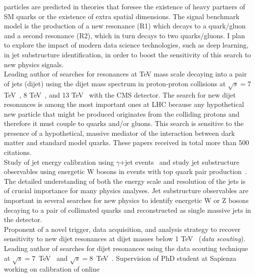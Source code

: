 \documentclass[10pt, a4paper]{article}
\newcommand{\years}[1]{\marginnote{\hskip-0.2in{\scriptsize #1}}}
\begin{document}
particles are predicted in theories that foresee the existence of
heavy partners of SM quarks or the existence of extra spatial
dimensions. The signal benchmark model is the production of a new resonance (R1)
which decays to a quark/gluon and a second resonance (R2), which in
turn decays to two quarks/gluons. I plan to explore the impact of
modern data science technologies, such as deep learning, in jet substructure identification, in order to boost the sensitivity of this search to new physics signals.\\ [1em] 
\years{09/2011 - 09/2018}Leading author of searches for resonances at
TeV mass scale decaying into a pair of jets (dijet) using the dijet mass spectrum 
in proton-proton collisions at $\sqrt{s}=$7 TeV~\cite{CMS:2012yf,AN-12-012}, 8
TeV~\cite{Chatrchyan:2013qha,AN-12-229,Khachatryan:2015sja,AN-12-455},
and 13 TeV~\cite{Sirunyan:2016iap,AN-16-202,Khachatryan:2015dcf,AN-15-063,AN-15-175} with the CMS
detector. The search for new dijet resonances is among the most important ones at LHC because any hypothetical new
particle that might be produced originates from the colliding protons
and therefore it must couple to quarks and/or gluons. This search is
sensitive to the presence of a hypothetical, massive  mediator of the interaction between dark matter and
standard model quarks. These papers received in total more than 500 citations.\\ [1em] 
\years{01/2015 - 09/2018}Study of jet energy calibration using $\gamma$+jet events~\cite{AN-16-344} and
study jet substructure observables using energetic W bosons in events with
top quark pair production~\cite{AN-17-051}. The detailed understanding of both 
the energy scale and resolution of the jets is of crucial importance
for many physics analyses. Jet substructure observables are important 
in several searches for new physics to identify energetic W or Z bosons decaying to 
a pair of collimated quarks and reconstructed as single massive jets
in the detector. \\ [1em] 
\years{09/2011 - 09/2018}
Proponent of a novel trigger, data acquisition, and analysis
strategy to recover sensitivity to new dijet resonances at dijet
masses below 1 TeV~\cite{CMS-DP-2012-022} ({\it data scouting}).
Leading author of searches for dijet resonances using the data
scouting technique at $\sqrt{s}=7$~TeV~\cite{CMS-PAS-EXO-11-094} 
and $\sqrt{s}=8$~TeV~\cite{Khachatryan:2016ecr,AN-14-104}. Supervision
of PhD student at Sapienza working on calibration of online
\end{document}
